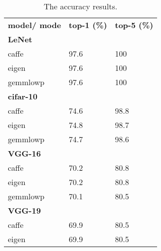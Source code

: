 \begin{table}[]
\centering
\caption[Accuracy results]{The accuracy results.}
\label{tbl:accuracies}
\begin{tabular}{lll}
\textbf{model/ mode} & \textbf{top-1 (\%)} &  \textbf{top-5 (\%)} \\
\multicolumn{3}{l}{\textbf{LeNet}}                                                                                   \\
caffe                & 97.6                                        & 100                                             \\
eigen                & 97.6                                        & 100                                            \\
gemmlowp             & 97.6                                       & 100                                              \\
\multicolumn{3}{l}{\textbf{cifar-10}}                                                                               \\
caffe                & 74.6                                       & 98.8                                          \\
eigen                & 74.8                                    & 98.7                                          \\
gemmlowp             & 74.7                                      & 98.6                                         \\
\multicolumn{3}{l}{\textbf{VGG-16}}                                                                             \\
caffe                & 70.2                                      & 80.8                                         \\
eigen                & 70.2                                       & 80.8                                        \\
gemmlowp             & 70.1                                        & 80.5                                         \\
\multicolumn{3}{l}{\textbf{VGG-19}}                                                                               \\
caffe                & 69.9                                        & 80.5                                        \\
eigen                & 69.9                                         & 80.5                                        \\

\end{tabular}
\end{table}
